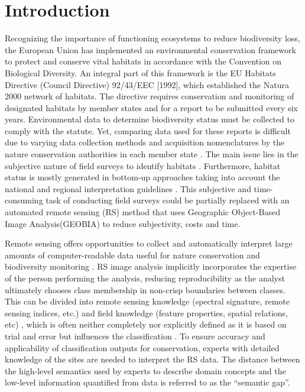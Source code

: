 \documentclass[authoryear, review,12pt,number]{elsarticle}
\begin{document}
\section{Introduction}
Recognizing the importance of functioning ecosystems to reduce biodiversity 
loss, the European Union has implemented an environmental conservation 
framework to protect and conserve vital habitats in accordance with the 
Convention on Biological Diversity. An integral part of this framework is the 
EU Habitats Directive (Council Directive) 92/43/EEC [1992], which established 
the Natura 2000 network of habitats. The directive requires conservation and 
monitoring of designated habitats by member states and for a report to be 
submitted every six years. Environmental data to determine biodiversity status 
must be collected to comply with the statute. Yet, comparing data used for 
these reports is difficult due to varying data collection methods and 
acquisition nomenclatures by the nature conservation authorities in each member 
state \citep{VandenBorre2011}. The main issue lies in the subjective nature of 
field surveys to identify habitats \citep{Cherrill1999, Cherrill1999a, 
Hearn_2011, Nieland2015}. Furthermore, habitat status is mostly generated in 
bottom-up approaches taking into account the national and regional 
interpretation guidelines \citep{VandenBorre2011, INSPIREdataspecs}. This 
subjective and time-consuming task of conducting field surveys could be 
partially replaced with an automated remote sensing (RS) method that uses 
Geographic Object-Based Image
Analysis(GEOBIA) to reduce subjectivity, costs and time.

Remote sensing offers opportunities to collect and automatically interpret large
amounts of computer-readable data useful for nature conservation and
biodiversity monitoring \citep{Corbane2015, VandenBorre2011, Mayer2011}. RS
image analysis implicitly incorporates the expertise of the person performing
the analysis, reducing reproducibility as the analyst ultimately chooses class
membership in non-crisp boundaries between classes. This can be divided into
remote sensing knowledge (spectral signature, remote sensing indices, etc.) and
field knowledge (feature properties, spatial relations, etc)
\citep{Andres2013a}, which is often neither completely nor explicitly defined as
it is based on trial and error but influences the classification
\citep{Arvor2013}. To ensure accuracy and applicability of classification
outputs for conservation, experts with detailed knowledge of the sites are
needed to interpret the RS data. The distance between the high-level semantics
used by experts to describe domain concepts and the low-level information
quantified from data is referred to as the ``semantic gap''.
\end{document}
